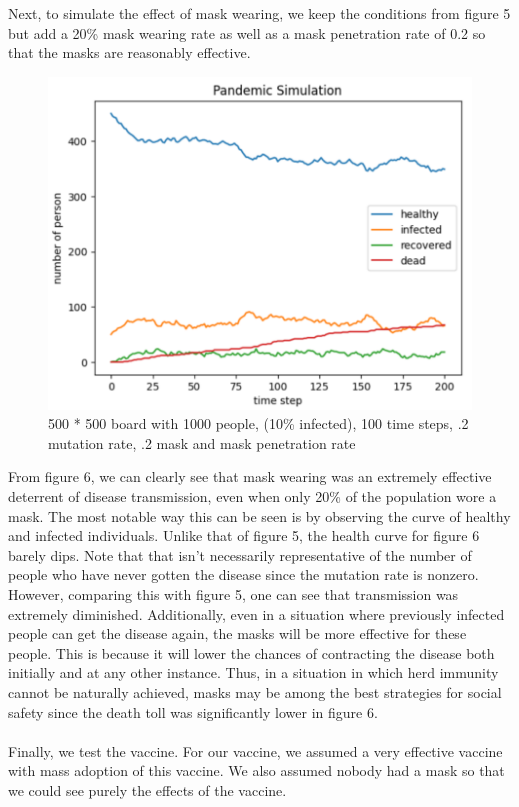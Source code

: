 \documentclass{article}
\begin{document}
Next, to simulate the effect of mask wearing, we keep the conditions from figure 5 but add a 20\% mask wearing rate as well as a mask penetration rate of 0.2 so that the masks are reasonably effective. 
\begin{figure}[H]
    \centering
    \includegraphics[width=.6\linewidth]{figure6.png}
    \caption{500 * 500 board with 1000 people, (10\% infected), 100 time steps, .2 mutation rate, .2 mask and mask penetration rate}
    \label{fig:enter-label}
\end{figure}
From figure 6, we can clearly see that mask wearing was an extremely effective deterrent of disease transmission, even when only 20\% of the population wore a mask. The most notable way this can be seen is by observing the curve of healthy and infected individuals. Unlike that of figure 5, the health curve for figure 6 barely dips. Note that that isn't necessarily representative of the number of people who have never gotten the disease since the mutation rate is nonzero. However, comparing this with figure 5, one can see that transmission was extremely diminished. Additionally, even in a situation where previously infected people can get the disease again, the masks will be more effective for these people. This is because it will lower the chances of contracting the disease both initially and at any other instance. Thus, in a situation in which herd immunity cannot be naturally achieved, masks may be among the best strategies for social safety since the death toll was significantly lower in figure 6. \\\\
Finally, we test the vaccine. For our vaccine, we assumed a very effective vaccine with mass adoption of this vaccine. We also assumed nobody had a mask so that we could see purely the effects of the vaccine. 
\end{document}
